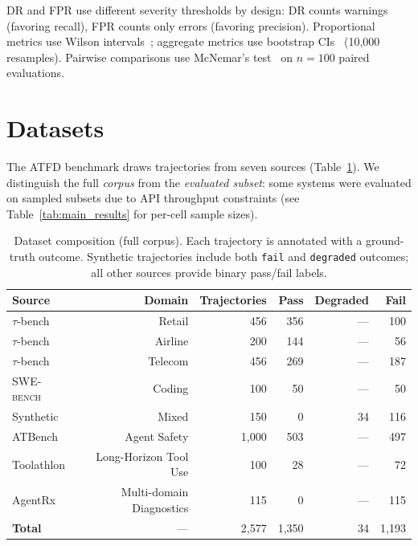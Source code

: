 \documentclass[11pt]{article}
\newcommand{\atfd}{\textsc{ATFD}\xspace}
\newcommand{\taubench}{$\tau$-bench\xspace}
\newcommand{\swebench}{\textsc{SWE-bench}\xspace}
\begin{document}
DR and FPR use different severity thresholds by design:
DR counts warnings (favoring recall), FPR counts only errors (favoring
precision). Proportional metrics use Wilson
intervals~\citep{wilson1927probable}; aggregate metrics use bootstrap
CIs~\citep{efron1993bootstrap} (10,000 resamples). Pairwise comparisons
use McNemar's test~\citep{mcnemar1947note} on $n = 100$ paired
evaluations.

\section{Datasets}
\label{sec:datasets}

The \atfd benchmark draws trajectories from seven sources
(Table~\ref{tab:datasets}). We distinguish the full \emph{corpus} from
the \emph{evaluated subset}: some systems were evaluated on sampled
subsets due to API throughput constraints (see Table~\ref{tab:main_results}
for per-cell sample sizes).

\begin{table}[t]
\centering
\caption{Dataset composition (full corpus). Each trajectory is annotated
with a ground-truth outcome. Synthetic trajectories include both
\texttt{fail} and \texttt{degraded} outcomes; all other sources provide
binary pass/fail labels.}
\label{tab:datasets}
\small
\begin{tabular}{@{}lrrrrr@{}}
\toprule
\textbf{Source} & \textbf{Domain} & \textbf{Trajectories} & \textbf{Pass} & \textbf{Degraded} & \textbf{Fail} \\
\midrule
\taubench   & Retail    & 456  & 356 & --- & 100 \\
\taubench   & Airline   & 200  & 144 & --- & 56 \\
\taubench   & Telecom   & 456  & 269 & --- & 187 \\
\swebench   & Coding    & 100  & 50  & --- & 50 \\
Synthetic   & Mixed     & 150  & 0   & 34  & 116 \\
ATBench     & Agent Safety & 1,000 & 503 & --- & 497 \\
Toolathlon  & Long-Horizon Tool Use & 100 & 28 & --- & 72 \\
AgentRx     & Multi-domain Diagnostics & 115 & 0 & --- & 115 \\
\midrule
\textbf{Total} & ---    & 2,577 & 1,350 & 34 & 1,193 \\
\bottomrule
\end{tabular}
\end{table}
\end{document}
